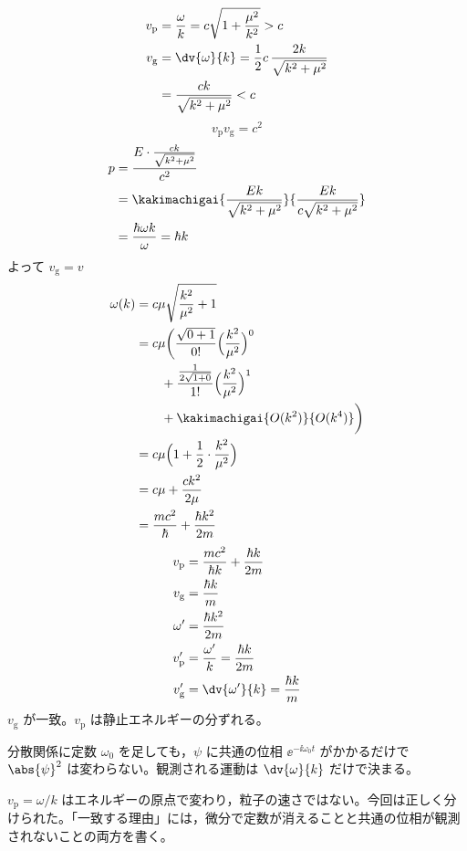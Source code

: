 \begin{align*}
v_{\mathrm{p}}&=\frac{\omega}{k}=c\sqrt{1+\frac{\mu^{2}}{k^{2}}}>c\\
v_{\mathrm{g}}&=\dv{\omega}{k}=\frac{1}{2}c\,\frac{2k}{\sqrt{k^{2}+\mu^{2}}}\\
&=\frac{ck}{\sqrt{k^{2}+\mu^{2}}}<c
\end{align*}
\[ v_{\mathrm{p}}v_{\mathrm{g}}=c^{2} \]
\begin{align*}
p&=\frac{E\cdot\frac{ck}{\sqrt{k^{2}+\mu^{2}}}}{c^{2}}\\
&=\kakimachigai{\frac{Ek}{\sqrt{k^{2}+\mu^{2}}}}{\frac{Ek}{c\sqrt{k^{2}+\mu^{2}}}}\\
&=\frac{\hbar\omega k}{\omega}=\hbar k
\end{align*}
よって $v_{\mathrm{g}}=v$
\begin{align*}
\omega(k)&=c\mu\sqrt{\frac{k^{2}}{\mu^{2}}+1}\\
&=c\mu\biggl(\frac{\sqrt{0+1}}{0!}\Bigl(\frac{k^{2}}{\mu^{2}}\Bigr)^{0}\\
&\qquad+\frac{\frac{1}{2\sqrt{1+0}}}{1!}\Bigl(\frac{k^{2}}{\mu^{2}}\Bigr)^{1}\\
&\qquad+\kakimachigai{O(k^{2})}{O(k^{4})}\biggr)\\
&=c\mu\Bigl(1+\frac{1}{2}\cdot\frac{k^{2}}{\mu^{2}}\Bigr)\\
&=c\mu+\frac{ck^{2}}{2\mu}\\
&=\frac{mc^{2}}{\hbar}+\frac{\hbar k^{2}}{2m}
\end{align*}
\begin{align*}
v_{\mathrm{p}}&=\frac{mc^{2}}{\hbar k}+\frac{\hbar k}{2m}\\
v_{\mathrm{g}}&=\frac{\hbar k}{m}\\
\omega'&=\frac{\hbar k^{2}}{2m}\\
v_{\mathrm{p}}'&=\frac{\omega'}{k}=\frac{\hbar k}{2m}\\
v_{\mathrm{g}}'&=\dv{\omega'}{k}=\frac{\hbar k}{m}
\end{align*}
$v_{\mathrm{g}}$ が一致。$v_{\mathrm{p}}$ は静止エネルギーの分ずれる。
\item 分散関係に定数 $\omega_{0}$ を足しても，$\psi$ に共通の位相 $\ee^{-\ii\omega_{0}t}$ がかかるだけで $\abs{\psi}^{2}$ は変わらない。観測される運動は $\dv{\omega}{k}$ だけで決まる。
\item {} $v_{\mathrm{p}}=\omega/k$ はエネルギーの原点で変わり，粒子の速さではない。今回は正しく分けられた。「一致する理由」には，微分で定数が消えることと共通の位相が観測されないことの両方を書く。
